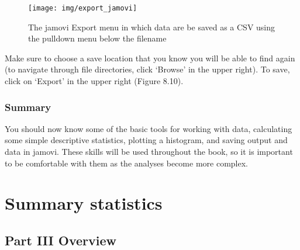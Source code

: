 \documentclass[
]{scrbook}
\begin{document}
\begin{figure}
\texttt{[image: img/export\_jamovi]} \caption{The jamovi Export menu in which data are be saved as a CSV using the pulldown menu below the filename}\label{fig:unnamed-chunk-34}
\end{figure}

Make sure to choose a save location that you know you will be able to find again (to navigate through file directories, click `Browse' in the upper right).
To save, click on `Export' in the upper right (Figure 8.10).

\hypertarget{summary-1}{%
\section{Summary}\label{summary-1}}

You should now know some of the basic tools for working with data, calculating some simple descriptive statistics, plotting a histogram, and saving output and data in jamovi.
These skills will be used throughout the book, so it is important to be comfortable with them as the analyses become more complex.

\hypertarget{part-summary-statistics}{%
\part{Summary statistics}\label{part-summary-statistics}}

\hypertarget{Week3}{%
\chapter*{Part III Overview}\label{Week3}}
\end{document}
